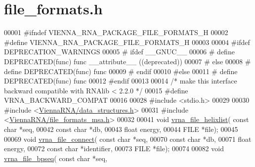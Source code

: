 \hypertarget{file__formats_8h_source}{}\section{file\+\_\+formats.\+h}
\label{file__formats_8h_source}

\begin{DoxyCode}
00001 \textcolor{preprocessor}{#ifndef VIENNA\_RNA\_PACKAGE\_FILE\_FORMATS\_H}
00002 \textcolor{preprocessor}{#define VIENNA\_RNA\_PACKAGE\_FILE\_FORMATS\_H}
00003 
00004 \textcolor{preprocessor}{#ifdef DEPRECATION\_WARNINGS}
00005 \textcolor{preprocessor}{# ifdef \_\_GNUC\_\_}
00006 \textcolor{preprocessor}{#  define DEPRECATED(func) func \_\_attribute\_\_ ((deprecated))}
00007 \textcolor{preprocessor}{# else}
00008 \textcolor{preprocessor}{#  define DEPRECATED(func) func}
00009 \textcolor{preprocessor}{# endif}
00010 \textcolor{preprocessor}{#else}
00011 \textcolor{preprocessor}{# define DEPRECATED(func) func}
00012 \textcolor{preprocessor}{#endif}
00013 
00014 \textcolor{comment}{/* make this interface backward compatible with RNAlib < 2.2.0 */}
00015 \textcolor{preprocessor}{#define VRNA\_BACKWARD\_COMPAT}
00016 
00028 \textcolor{preprocessor}{#include <stdio.h>}
00029 
00030 \textcolor{preprocessor}{#include <\hyperlink{data__structures_8h}{ViennaRNA/data\_structures.h}>}
00031 \textcolor{preprocessor}{#include <\hyperlink{file__formats__msa_8h}{ViennaRNA/file\_formats\_msa.h}>}
00032 
00041 \textcolor{keywordtype}{void} \hyperlink{group__file__utils_gaaface7db12fadc3d271641c4515ab6e4}{vrna\_file\_helixlist}( \textcolor{keyword}{const} \textcolor{keywordtype}{char} *seq,
00042                           \textcolor{keyword}{const} \textcolor{keywordtype}{char} *db,
00043                           \textcolor{keywordtype}{float} energy,
00044                           FILE *file);
00045 
00069 \textcolor{keywordtype}{void} \hyperlink{group__file__utils_gab69682373ccca1e0e28cc967eec07745}{vrna\_file\_connect}( \textcolor{keyword}{const} \textcolor{keywordtype}{char} *seq,
00070                         \textcolor{keyword}{const} \textcolor{keywordtype}{char} *db,
00071                         \textcolor{keywordtype}{float} energy,
00072                         \textcolor{keyword}{const} \textcolor{keywordtype}{char} *identifier,
00073                         FILE *file);
00074 
00082 \textcolor{keywordtype}{void} \hyperlink{group__file__utils_ga9b462e6f202594af5d3fa56e280d633f}{vrna\_file\_bpseq}( \textcolor{keyword}{const} \textcolor{keywordtype}{char} *seq,

\end{DoxyCode}
